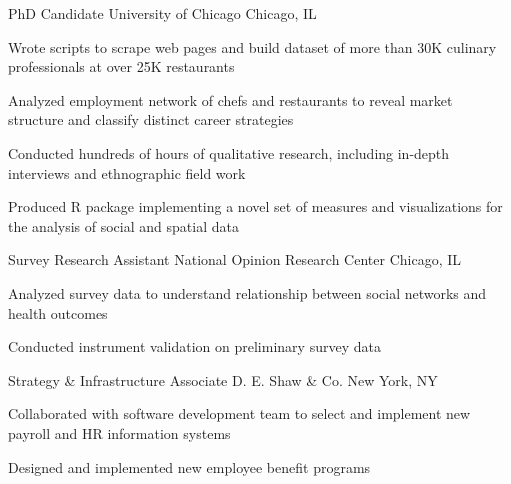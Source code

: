   {PhD Candidate}
  {University of Chicago}
  {Chicago, IL}
  {}
  {
    \item Wrote scripts to scrape web pages and build dataset of more than 30K culinary professionals at over 25K restaurants
    \item Analyzed employment network of chefs and restaurants to reveal market structure and classify distinct career strategies
    \item Conducted hundreds of hours of qualitative research, including in-depth interviews and ethnographic field work 
    \item Produced R package implementing a novel set of measures and visualizations for the analysis of social and spatial data
  }

  {Survey Research Assistant}
  {National Opinion Research Center}
  {Chicago, IL}
  {}
  {
    \item Analyzed survey data to understand relationship between social networks and health outcomes
    \item Conducted instrument validation on preliminary survey data
  }

  {Strategy \& Infrastructure Associate}
  {D. E. Shaw \& Co.}
  {New York, NY}
  {}
  {
    \item Collaborated with software development team to select and implement new payroll and HR information systems
    \item Designed and implemented new employee benefit programs
  }

